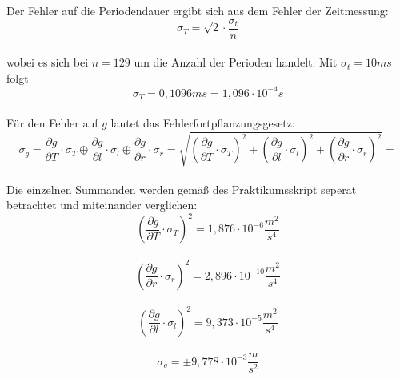 \documentclass[a4paper, 11pt]{article}
\begin{document}
Der Fehler auf die Periodendauer ergibt sich aus dem Fehler der Zeitmessung:
\begin{equation*}
\sigma_T = \sqrt{2} \cdot \frac{\sigma_t }{n}
\end{equation*}
\\
wobei es sich bei $n=129$ um die Anzahl der Perioden handelt. Mit $\sigma_t = 10 ms $ folgt
\begin{equation*}
\sigma_T = 0,1096ms = 1,096 \cdot 10^{-4} s
\end{equation*}
\\

Für den Fehler auf $g$ lautet das Fehlerfortpflanzungsgesetz:
\begin{equation*}
\sigma_g = \frac{\partial g}{\partial T}\cdot\sigma_T \oplus \frac{\partial g}{\partial l}\cdot\sigma_l \oplus \frac{\partial g}{\partial r}\cdot\sigma_r = \sqrt{(\frac{\partial g}{\partial T}\cdot\sigma_T)^2 + (\frac{\partial g}{\partial l}\cdot\sigma_l)^2+( \frac{\partial g}{\partial r}\cdot\sigma_r)^2} = 
\end{equation*}
\\
Die einzelnen Summanden werden gemäß des Praktikumsskript seperat betrachtet und miteinander verglichen:
\\
\begin{equation*}
(\frac{\partial g}{\partial T}\cdot\sigma_T)^2 = 1,876 \cdot 10^{-6} \frac{m^2}{s^4} 
\end{equation*}
\\
\begin{equation*}
(\frac{\partial g}{\partial r}\cdot\sigma_r)^2 = 2,896 \cdot 10^{-10} \frac{m^2}{s^4} 
\end{equation*}
\\
\begin{equation*}
(\frac{\partial g}{\partial l}\cdot\sigma_l)^2 = 9,373 \cdot 10^{-5} \frac{m^2}{s^4}
\end{equation*}
\\
\begin{equation*}
\sigma_g = \pm9,778\cdot10^{-3} \frac{m}{s^2}
\end{equation*}\

\newpage
\end{document}
